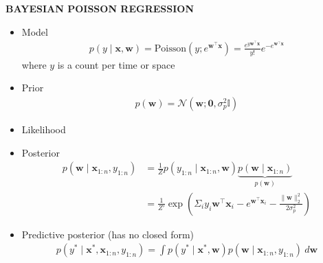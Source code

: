 \begin{whitebox}{\textbf{BAYESIAN POISSON REGRESSION}}
    \begin{itemize}
        \item Model
        \begin{align*}
            p(y\mid \bm{x},\bm{w})=\mathrm{Poisson}(y;e^{\bm{w}^\top\bm{x}})=\frac{e^{y\bm{w}^\top\bm{x}}}{y!}e^{-e^{\bm{w}^\top\bm{x}}}
        \end{align*}
        where $y$ is a count per time or space
        \item Prior
        \begin{align*}
            p(\bm{w})=\mathcal{N}(\bm{w};\bm{0},\sigma_p^2\mathbb{I})
        \end{align*}
        \item Likelihood
        \begin{center}
        \end{center}
        \item Posterior
        \begin{align*}
            p(\bm{w}\mid \bm{x}_{1:n},y_{1:n})&=\frac{1}{Z}p(y_{1:n}\mid \bm{x}_{1:n},\bm{w})\underbrace{p(\bm{w}\mid \bm{x}_{1:n})}_{p(\bm{w})}\\
            &=\frac{1}{Z'}\exp\left(\Sigma_iy_i\bm{w}^\top\bm{x}_i-e^{\bm{w}^\top\bm{x}_i}-\frac{\|\bm{w}\|_2^2}{2\sigma_p^2}\right)
        \end{align*}
        \item Predictive posterior (has no closed form)
        \begin{align*}
            p(y^*\mid \bm{x}^*,\bm{x}_{1:n},y_{1:n})=\int p(y^*\mid \bm{x}^*,\bm{w})p(\bm{w}\mid \bm{x}_{1:n},y_{1:n})\ d\bm{w}
        \end{align*}
    \end{itemize}
\end{whitebox}


